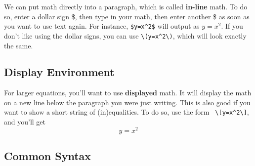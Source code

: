 \documentclass[12pt]{article}
\begin{document}
We can put math directly into a paragraph, which is called \textbf{in-line} math. To do so, enter a dollar sign \$, then type in your math, then enter another \$ as soon as you want to use text again. For instance, \verb|$y=x^2$|  will output as $y=x^2$. If you don't like using the dollar signs, you can use \verb|\(y=x^2\)|, which will look exactly the same.  


\subsection{Display Environment}

For larger equations, you'll want to use \textbf{displayed} math. It will display the math on a new line below the paragraph you were just writing. This is also good if you want to show a short string of (in)equalities.  To do so, use the form  \verb| \[y=x^2\]|, and you'll get
		\[y=x^2\]


\subsection{Common Syntax}
\end{document}
